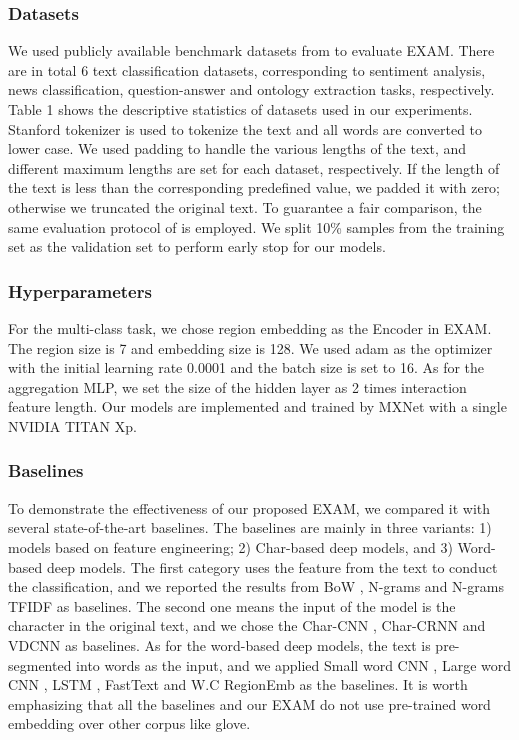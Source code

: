 \documentclass[letterpaper]{article} %
\begin{document}
\subsubsection{Datasets}
We used publicly available benchmark datasets from \cite{charcnn} to evaluate EXAM. There are in total 6 text classification datasets, corresponding to sentiment analysis, news classification, question-answer and ontology extraction tasks, respectively. Table 1 shows the descriptive statistics of datasets used in our experiments. Stanford tokenizer is used to tokenize the text and all words are converted to lower case. We used padding to handle the various lengths of the text, and different maximum lengths are set for each dataset, respectively. If the length of the text is less than the corresponding predefined value, we padded it with zero; otherwise we truncated the original text. To guarantee a fair comparison, the same evaluation protocol of \cite{charcnn} is employed. We split 10\% samples from the training set as the validation set to perform early stop for our models.

\subsubsection{Hyperparameters}
For the multi-class task, we chose region embedding as the Encoder in EXAM. The region size is 7 and embedding size is 128. We used adam \cite{adam} as the optimizer with the initial learning rate 0.0001 and the batch size is set to 16. As for the aggregation MLP, we set the size of the hidden layer as 2 times interaction feature length. Our models are implemented and trained by MXNet \cite{MXNet} with a single NVIDIA TITAN Xp.
\subsubsection{Baselines}
To demonstrate the effectiveness of our proposed EXAM, we compared it with several state-of-the-art baselines. The baselines are mainly in three variants: 1) models based on feature engineering; 2) Char-based deep models, and 3) Word-based deep models. The first category uses the feature from the text to conduct the classification, and we reported the results from BoW \cite{charcnn}, N-grams \cite{charcnn} and N-grams TFIDF \cite{charcnn} as baselines. The second one means the input of the model is the character in the original text, and we chose the Char-CNN \cite{charcnn}, Char-CRNN \cite{charcnn} and VDCNN \cite{vdcnn} as baselines. As for the word-based deep models, the text is pre-segmented into words as the input, and we applied Small word CNN \cite{charcnn}, Large word CNN \cite{charcnn}, LSTM \cite{charcnn}, FastText \cite{fasttext} and W.C RegionEmb \cite{regionemb} as the baselines.  It is worth emphasizing that all the baselines and our EXAM do not use pre-trained word embedding over other corpus like glove.
\end{document}

